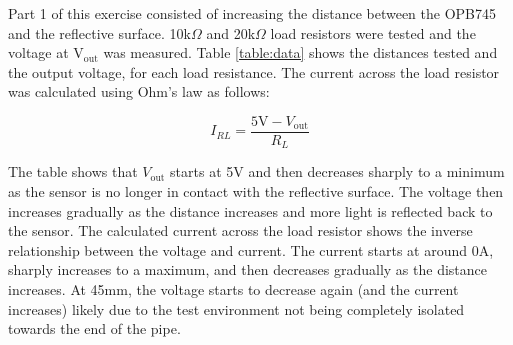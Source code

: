\documentclass[CMPE]{KGCOEReport}
\begin{document}
Part 1 of this exercise consisted of increasing the distance between the OPB745 and the reflective surface. 10k$\Omega$ and 20k$\Omega$ load resistors were tested and the voltage at V$_{\text{out}}$ was measured. Table \ref{table:data} shows the distances tested and the output voltage, for each load resistance. The current across the load resistor was calculated using Ohm's law as follows:

\[ I_{RL} = \frac{5\text{V} - V_{\text{out}}}{R_L} \]

The table shows that $V_{\text{out}}$ starts at 5V and then decreases sharply to a minimum as the sensor is no longer in contact with the reflective surface. The voltage then increases gradually as the distance increases and more light is reflected back to the sensor. The calculated current across the load resistor shows the inverse relationship between the voltage and current. The current starts at around 0A, sharply increases to a maximum, and then decreases gradually as the distance increases. At 45mm, the voltage starts to decrease again (and the current increases) likely due to the test environment not being completely isolated towards the end of the pipe.
\end{document}
